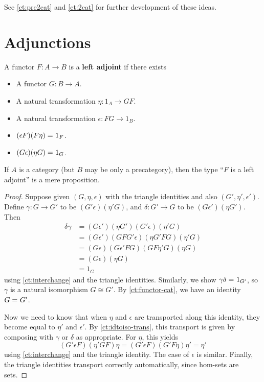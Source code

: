 See \autoref{ct:pre2cat} and \autoref{ct:2cat} for further development of these ideas.


\section{Adjunctions}
\label{sec:adjunctions}

\begin{defn}
  A functor $F:A\to B$ is a \textbf{left adjoint} if there exists
  \begin{itemize}
  \item A functor $G:B\to A$.
  \item A natural transformation $\eta:1_A \to GF$.
  \item A natural transformation $\epsilon:FG\to 1_B$.
  \item $(\epsilon F)(F\eta) =_{} 1_F$.
  \item $(G\epsilon)(\eta G) =_{} 1_G$.
  \end{itemize}
\end{defn}

\begin{lem}\label{ct:adjprop}
  If $A$ is a category (but $B$ may be only a precategory), then the type ``$F$ is a left adjoint'' is a mere proposition.
\end{lem}
\begin{proof}
  Suppose given $(G,\eta,\epsilon)$ with the triangle identities and also $(G',\eta',\epsilon')$.
  Define $\gamma:G\to G'$ to be $(G'\epsilon)(\eta' G)$, and $\delta:G'\to G$ to be $(G\epsilon')(\eta G')$.
  Then
  \begin{align*}
    \delta\gamma &=
    (G\epsilon')(\eta G')(G'\epsilon)(\eta'G)\\
    &= (G\epsilon')(G F G'\epsilon)(\eta G' F G)(\eta'G)\\
    &= (G\epsilon)(G\epsilon'FG)(G F \eta' G)(\eta G)\\
    &= (G\epsilon)(\eta G)\\
    &= 1_G
  \end{align*}
  using \autoref{ct:interchange} and the triangle identities.
  Similarly, we show $\gamma\delta =_{} 1_{G'}$, so $\gamma$ is a natural isomorphism $G\cong G'$.
  By \autoref{ct:functor-cat}, we have an identity $G =_{} G'$.

  Now we need to know that when $\eta$ and $\epsilon$ are transported along this identity, they become equal to $\eta'$ and $\epsilon'$.
  By \autoref{ct:idtoiso-trans}, this transport is given by composing with $\gamma$ or $\delta$ as appropriate.
  For $\eta$, this yields
  \begin{equation*}
    (G'\epsilon F)(\eta'GF)\eta
    = (G'\epsilon F)(G'F\eta)\eta'
    = \eta'
  \end{equation*}
  using \autoref{ct:interchange} and the triangle identity.
  The case of $\epsilon$ is similar.
  Finally, the triangle identities transport correctly automatically, since hom-sets are sets.
\end{proof}

